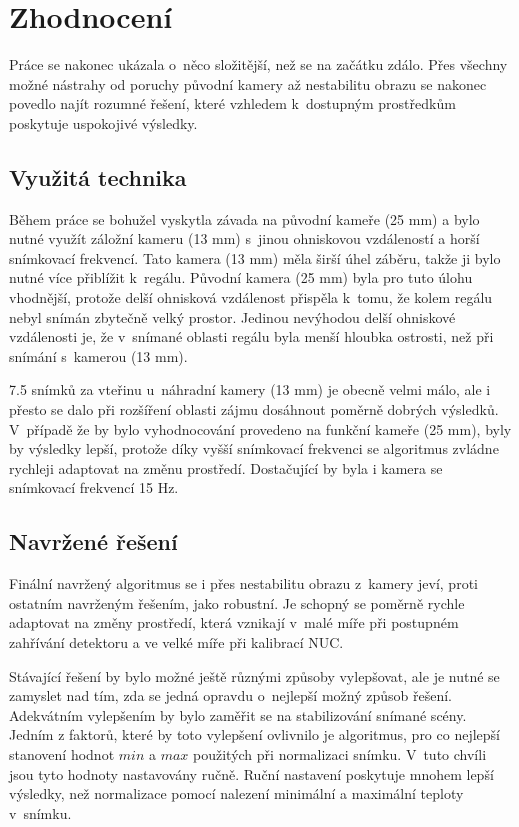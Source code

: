 \chapter{Zhodnocení}
Práce se nakonec ukázala o~něco složitější, než se na začátku zdálo. Přes všechny možné nástrahy od poruchy původní kamery až nestabilitu obrazu se nakonec povedlo najít rozumné řešení, které vzhledem k~dostupným prostředkům poskytuje uspokojivé výsledky. 

\section{Využitá technika}
Během práce se bohužel vyskytla závada na původní kameře (25 mm) a bylo nutné využít záložní kameru (13 mm) s~jinou ohniskovou vzdáleností a horší snímkovací frekvencí. Tato kamera (13 mm) měla širší úhel záběru, takže ji bylo nutné více přiblížit k~regálu. Původní kamera (25 mm) byla pro tuto úlohu vhodnější, protože delší ohnisková vzdálenost přispěla k~tomu, že kolem regálu nebyl snímán zbytečně velký prostor. Jedinou nevýhodou delší ohniskové vzdálenosti je, že v~snímané oblasti regálu byla menší hloubka ostrosti, než při snímání s~kamerou (13 mm). 

7.5 snímků za vteřinu u~náhradní kamery (13 mm) je obecně velmi málo, ale i přesto se dalo při rozšíření oblasti zájmu dosáhnout poměrně dobrých výsledků. V~případě že by bylo vyhodnocování provedeno na funkční kameře (25 mm), byly by výsledky lepší, protože díky vyšší snímkovací frekvenci se algoritmus zvládne rychleji adaptovat na změnu prostředí. Dostačující by byla i kamera se snímkovací frekvencí 15 Hz.

\section{Navržené řešení}
Finální navržený algoritmus se i přes nestabilitu obrazu z~kamery jeví, proti ostatním navrženým řešením, jako robustní. Je schopný se poměrně rychle adaptovat na změny prostředí, která vznikají v~malé míře při postupném zahřívání detektoru a ve velké míře při kalibrací NUC.

Stávající řešení by bylo možné ještě různými způsoby vylepšovat, ale je nutné se zamyslet nad tím, zda se jedná opravdu o~nejlepší možný způsob řešení. Adekvátním vylepšením by bylo zaměřit se na stabilizování snímané scény. Jedním z faktorů, které by toto vylepšení ovlivnilo je algoritmus, pro co nejlepší stanovení hodnot $min$ a $max$ použitých při normalizaci snímku. V~tuto chvíli jsou tyto hodnoty nastavovány ručně. Ruční nastavení poskytuje mnohem lepší výsledky, než normalizace pomocí nalezení minimální a maximální teploty v~snímku. 

